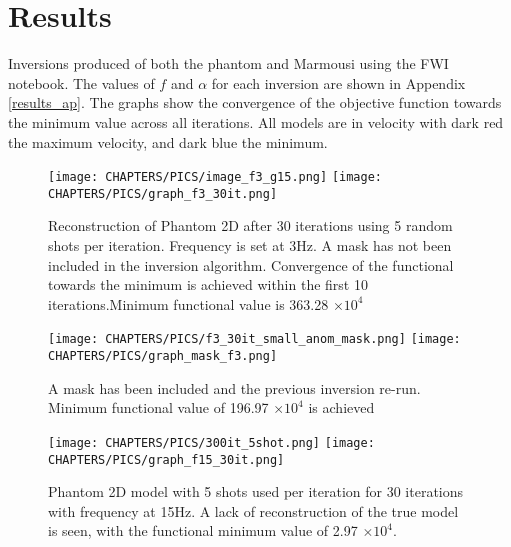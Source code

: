 \chapter{Results}
\label{results}

Inversions produced of both the phantom and Marmousi using the FWI notebook. The values of $f$ and $\alpha$ for each inversion are shown in Appendix \ref{results_ap}. The graphs show the convergence of the objective function towards the minimum value across all iterations. All models are in velocity with dark red the maximum velocity, and dark blue the minimum. 
\begin{landscape}

\begin{figure}[!ht]
  \centering
   \texttt{[image: CHAPTERS/PICS/image\_f3\_g15.png]}
  \vspace*{\floatsep}
  \texttt{[image: CHAPTERS/PICS/graph\_f3\_30it.png]}
  \caption[Reconstruction of Phantom 2D after 30 iterations with frequency at 3Hz]
{Reconstruction of Phantom 2D after 30 iterations using 5 random shots per iteration. Frequency is set at 3Hz. A mask has not been included in the inversion algorithm. Convergence of the functional towards the minimum is achieved within the first 10 iterations.Minimum functional value is 363.28 $\times 10^{4}$}
 \label{f3_30it}
\end{figure}

\begin{figure}
  \centering
   \texttt{[image: CHAPTERS/PICS/f3\_30it\_small\_anom\_mask.png]}
  \vspace*{\floatsep}
  \texttt{[image: CHAPTERS/PICS/graph\_mask\_f3.png]}
  \caption[]{A mask has been included and the previous inversion re-run. Minimum functional value of 196.97 $\times 10^{4}$ is achieved}
 \label{mask}
\end{figure}

\begin{figure}[!ht]
  \centering
 \texttt{[image: CHAPTERS/PICS/300it\_5shot.png]}
  \vspace*{\floatsep}
  \texttt{[image: CHAPTERS/PICS/graph\_f15\_30it.png]}
\caption[Phantom 2D model with 5 shots used per iteration for 30 iterations with frequency at 15Hz ]{Phantom 2D model with 5 shots used per iteration for 30 iterations with frequency at 15Hz. A lack of reconstruction of the true model is seen, with the functional minimum value of 2.97 $\times 10^{4}$.}
 \label{f15_30it}
\end{figure}


\end{landscape}
